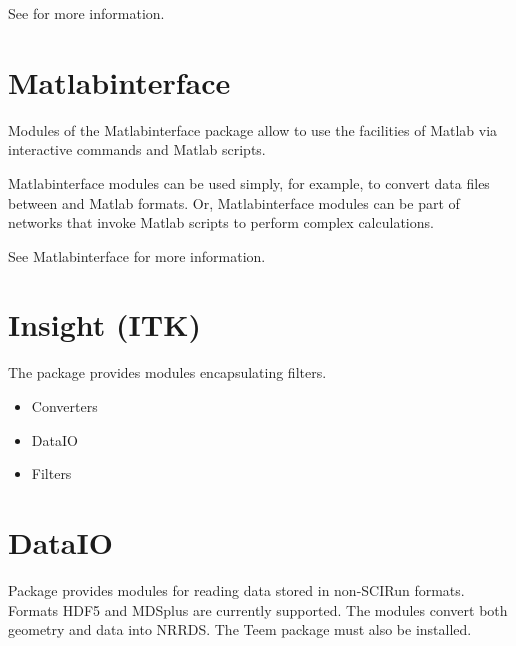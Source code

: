 See  for more
information.

\section{Matlabinterface}
\label{sec:matlabpackage}

Modules of the Matlabinterface package allow \sr{} to use the
facilities of Matlab via interactive commands and Matlab scripts.

Matlabinterface modules can be used simply, for example, to convert
data files between \sr{} and Matlab formats. Or, Matlabinterface
modules can be part of \sr{} networks that invoke Matlab scripts to
perform complex calculations.

See Matlabinterface  for more
information.

\section{Insight (ITK)}
\label{sec:insightpackage}

The 
package provides modules encapsulating  filters.

\begin{itemize}
\item Converters
\item DataIO
\item Filters
\end{itemize}

\section{DataIO}
\label{sec:dataiopackage}

Package 
provides modules for reading data stored in non-SCIRun formats.
Formats HDF5 and MDSplus are currently supported. The modules convert
both geometry and data into NRRDS. The Teem package must also be
installed.

